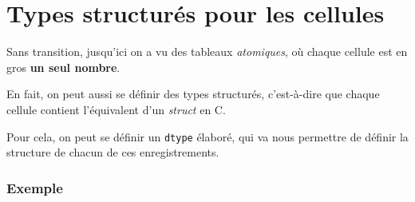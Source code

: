     \hypertarget{types-structuruxe9s-pour-les-cellules}{%
\section{Types structurés pour les
cellules}\label{types-structuruxe9s-pour-les-cellules}}

    Sans transition, jusqu'ici on a vu des tableaux \emph{atomiques}, où
chaque cellule est en gros \textbf{un seul nombre}.

En fait, on peut aussi se définir des types structurés, c'est-à-dire que
chaque cellule contient l'équivalent d'un \emph{struct} en C.

Pour cela, on peut se définir un \texttt{dtype} élaboré, qui va nous
permettre de définir la structure de chacun de ces enregistrements.

    \hypertarget{exemple}{%
\subsubsection{Exemple}\label{exemple}}

